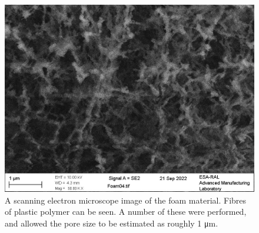 \begin{figure}
\begin{centering}
\includegraphics[width=1.0\textwidth]{figures/AppendixExperiment/FoamSEM.jpg}%
\caption{\label{fig:Appx-Foam04} A scanning electron microscope image of the foam material. Fibres of plastic polymer can be seen. A number of these were performed, and allowed the pore size to be estimated as roughly 1 \unit{\micro\meter}.}
\end{centering}
\end{figure}

